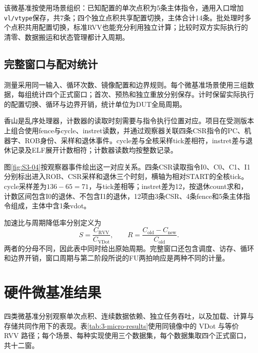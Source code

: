 该微基准按使用场景组织：已知配置的单次点积为5条主体指令，通用入口增加\texttt{vl/vtype}保存，共7条；四个独立点积共享配置切换，主体合计14条。批处理时多个点积共用配置切换，标准RVV也能充分利用独立计算；比较时双方实际执行的清零、数据搬运和状态管理都计入周期。

\subsection{完整窗口与配对统计}
测量采用同一输入、循环次数、镜像配置和边界规则。每个微基准场景使用三组数据，每组统计四个正式窗口；首次、预热和独立重放分别保存。计时保留实际执行的配置切换、循环与边界开销，统计单位为DUT全局周期。

香山是乱序处理器，计数器的读取时刻需要与指令执行位置对应。项目在受测版本上组合使用fence与cycle、instret读数，并通过观察器关联四条CSR指令的PC、机器字、ROB身份、采样和退休事件。cycle差与全核采样tick差相符，instret差与退休记录及ELF展开计数相符；计数器读数均按整数记录。

图\ref{fig:S3-04}按观察器事件绘出这一对应关系。四条CSR读取指令I0、C0、C1、I1分别标出进入ROB、CSR采样和退休三个时刻，横轴为相对START的全核tick。cycle采样差为$136-65=71$，与tick差相等；instret差为12，按退休count求和，计数区间包含I0的退休、不包含I1的退休，12项由3条CSR、4条fence和5条主体指令组成，主体中含1条vdot。

加速比与周期降低率分别定义为
\[
S=\frac{C_{\mathrm{RVV}}}{C_{\mathrm{VDot}}},\qquad
R=\frac{C_{\mathrm{old}}-C_{\mathrm{new}}}{C_{\mathrm{old}}}.
\]
两者的分母不同，因此表中同时给出原始周期。完整窗口还包含调度、访存、循环和边界开销，窗口周期与第二阶段所说的FU两拍响应是两种不同的计量。



\section{硬件微基准结果}

四类微基准分别观察单次点积、连续数据依赖、独立任务吞吐，以及加载、计算与存储共同作用下的表现。表\ref{tab:3-micro-results}使用同镜像中的 VDot 与等价 RVV 路径；每个场景、每种实现使用三个数据集，每个数据集取四个正式窗口，共十二窗。

